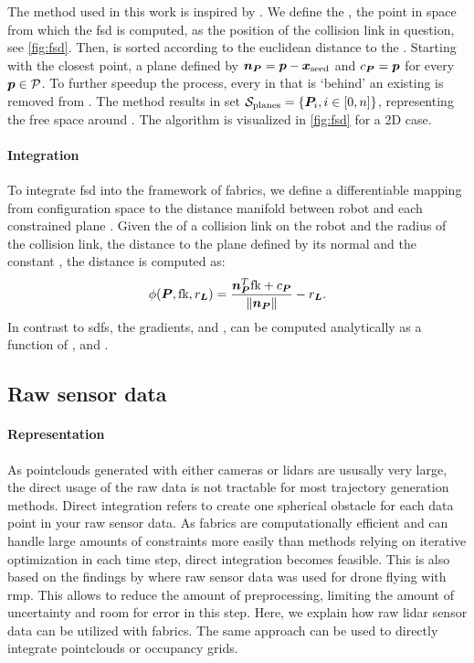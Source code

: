 The method used in this work is inspired by \cite{Liu2017a}. We define the
\seed{}, the point in space from which the \ac{fsd} is
computed, 
as the position of the collision link in question, see
\cref{fig:fsd}. Then,
\pointcloud{} is sorted according to the euclidean distance to the \seed{}.
Starting with the closest point, a plane \plane{} defined by $\bm{n}_{\bm{P}} = \bm{p} -
\bm{x}_{\textrm{seed}}$ and $c_{\bm{P}} = \bm{p}$ for every $\bm{p} \in \mathcal{P}$. To further
speedup the process, every \point{} in \pointcloud{} that is `behind' an
existing \plane{} is removed from \pointcloud{}. The method results in set
$\mathcal{S}_{\textrm{planes}} = \{\bm{P}_i, i\in[0,n]\}$, representing the free
space around \seed{}. The algorithm is visualized in \cref{fig:fsd} for a 2D
case.

\paragraph{Integration}
To integrate \ac{fsd} into the framework of \ac{fabrics}, we
define a differentiable mapping from configuration space \Q{} to the distance
manifold between robot and each constrained plane \plane{}.
Given the \fk{} of a collision link on the robot and the radius of the
collision link, the distance to the plane \plane{} defined by its normal
\np{} and the constant \cp{}, the distance is computed as:
\begin{equation}
  \phi({\bm{P},\textrm{fk},r_{\bm{L}}}) = \frac{\bm{n}_{\bm{P}}^T\textrm{fk} + c_{\bm{P}}}{\left\lVert\bm{n}_{\bm{P}}\right\rVert} - r_{\bm{L}}
  \label{eq:point_plane_distance}.
\end{equation}
In contrast to \acp{sdf}, the gradients, \J{} and \Jdot{}, can be
computed analytically as a function of \q{}, \np{} and \cp{}.



\subsection{Raw sensor data}
\label{sub:raw_sensor_data}

\paragraph{Representation}
As pointclouds generated with either cameras or lidars are
ususally very large, the direct usage of the raw data is not
tractable for most trajectory generation methods. Direct
integration refers to create one spherical obstacle for each
data point in your raw sensor data. As \ac{fabrics} are
computationally efficient and can handle large amounts of
constraints more easily than methods relying on iterative
optimization in each time step\cite{Spahn2023}, direct
integration becomes feasible. This is also based on the
findings by \cite{Pantic2023obstacle} where raw sensor data
was used for drone flying with \ac{rmp}. This allows to
reduce the amount of preprocessing, limiting the amount of
uncertainty and room for error in this step. Here, we
explain how raw lidar sensor data can be utilized with
\ac{fabrics}. The same approach can be used to directly
integrate pointclouds or occupancy grids.

